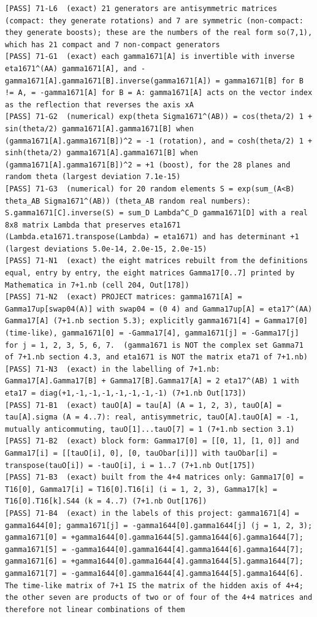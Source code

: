 \documentclass[
  10pt,
]{article}
\begin{document}
\begin{verbatim}
[PASS] 71-L6  (exact) 21 generators are antisymmetric matrices (compact: they generate rotations) and 7 are symmetric (non-compact: they generate boosts); these are the numbers of the real form so(7,1), which has 21 compact and 7 non-compact generators
[PASS] 71-G1  (exact) each gamma1671[A] is invertible with inverse eta1671^(AA) gamma1671[A], and -gamma1671[A].gamma1671[B].inverse(gamma1671[A]) = gamma1671[B] for B != A, = -gamma1671[A] for B = A: gamma1671[A] acts on the vector index as the reflection that reverses the axis xA
[PASS] 71-G2  (numerical) exp(theta Sigma1671^(AB)) = cos(theta/2) 1 + sin(theta/2) gamma1671[A].gamma1671[B] when (gamma1671[A].gamma1671[B])^2 = -1 (rotation), and = cosh(theta/2) 1 + sinh(theta/2) gamma1671[A].gamma1671[B] when (gamma1671[A].gamma1671[B])^2 = +1 (boost), for the 28 planes and random theta (largest deviation 7.1e-15)
[PASS] 71-G3  (numerical) for 20 random elements S = exp(sum_(A<B) theta_AB Sigma1671^(AB)) (theta_AB random real numbers):  S.gamma1671[C].inverse(S) = sum_D Lambda^C_D gamma1671[D] with a real 8x8 matrix Lambda that preserves eta1671 (Lambda.eta1671.transpose(Lambda) = eta1671) and has determinant +1 (largest deviations 5.0e-14, 2.0e-15, 2.0e-15)
[PASS] 71-N1  (exact) the eight matrices rebuilt from the definitions equal, entry by entry, the eight matrices Gamma17[0..7] printed by Mathematica in 7+1.nb (cell 204, Out[178])
[PASS] 71-N2  (exact) PROJECT matrices: gamma1671[A] = Gamma17up[swap04(A)] with swap04 = (0 4) and Gamma17up[A] = eta17^(AA) Gamma17[A] (7+1.nb section 5.3); explicitly gamma1671[4] = Gamma17[0] (time-like), gamma1671[0] = -Gamma17[4], gamma1671[j] = -Gamma17[j] for j = 1, 2, 3, 5, 6, 7.  (gamma1671 is NOT the complex set Gamma71 of 7+1.nb section 4.3, and eta1671 is NOT the matrix eta71 of 7+1.nb)
[PASS] 71-N3  (exact) in the labelling of 7+1.nb: Gamma17[A].Gamma17[B] + Gamma17[B].Gamma17[A] = 2 eta17^(AB) 1 with eta17 = diag(+1,-1,-1,-1,-1,-1,-1,-1) (7+1.nb Out[173])
[PASS] 71-B1  (exact) tauO[A] = tau[A] (A = 1, 2, 3), tauO[A] = tau[A].sigma (A = 4..7): real, antisymmetric, tauO[A].tauO[A] = -1, mutually anticommuting, tauO[1]...tauO[7] = 1 (7+1.nb section 3.1)
[PASS] 71-B2  (exact) block form: Gamma17[0] = [[0, 1], [1, 0]] and Gamma17[i] = [[tauO[i], 0], [0, tauObar[i]]] with tauObar[i] = transpose(tauO[i]) = -tauO[i], i = 1..7 (7+1.nb Out[175])
[PASS] 71-B3  (exact) built from the 4+4 matrices only: Gamma17[0] = T16[0], Gamma17[i] = T16[0].T16[i] (i = 1, 2, 3), Gamma17[k] = T16[0].T16[k].S44 (k = 4..7) (7+1.nb Out[176])
[PASS] 71-B4  (exact) in the labels of this project: gamma1671[4] = gamma1644[0]; gamma1671[j] = -gamma1644[0].gamma1644[j] (j = 1, 2, 3); gamma1671[0] = +gamma1644[0].gamma1644[5].gamma1644[6].gamma1644[7]; gamma1671[5] = -gamma1644[0].gamma1644[4].gamma1644[6].gamma1644[7]; gamma1671[6] = +gamma1644[0].gamma1644[4].gamma1644[5].gamma1644[7]; gamma1671[7] = -gamma1644[0].gamma1644[4].gamma1644[5].gamma1644[6].  The time-like matrix of 7+1 IS the matrix of the hidden axis of 4+4; the other seven are products of two or of four of the 4+4 matrices and therefore not linear combinations of them

\end{verbatim}
\end{document}
